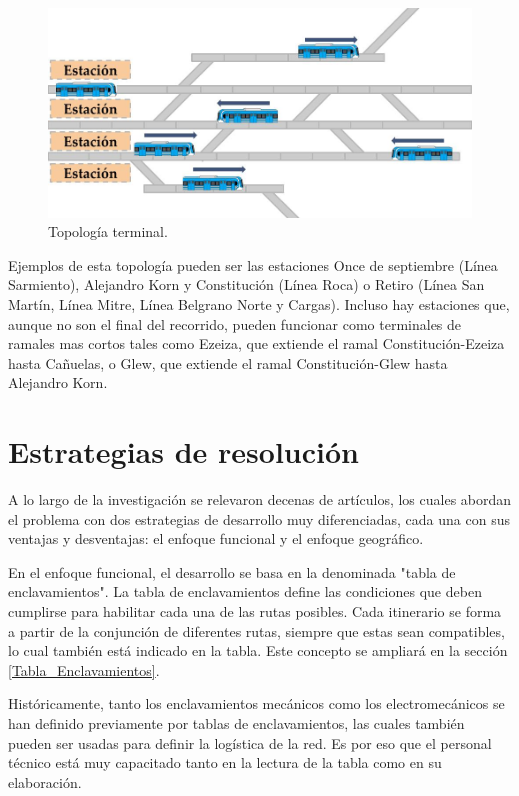 			\begin{figure}[h]
			\centering
				\includegraphics[scale=.4]{./Figures/Terminal}
				\caption{Topología terminal.}
				\label{fig:Terminal}
			\end{figure}
		
		Ejemplos de esta topología pueden ser las estaciones Once de septiembre (Línea Sarmiento), Alejandro Korn y Constitución (Línea Roca) o Retiro (Línea San Martín, Línea Mitre, Línea Belgrano Norte y Cargas). Incluso hay estaciones que, aunque no son el final del recorrido, pueden funcionar como terminales de ramales mas cortos tales como Ezeiza, que extiende el ramal Constitución-Ezeiza hasta Cañuelas, o Glew, que extiende el ramal Constitución-Glew hasta Alejandro Korn.
		

\section{Estrategias de resolución}
	\label{2_2}
	A lo largo de la investigación se relevaron decenas de artículos, los cuales abordan el problema con dos estrategias de desarrollo muy diferenciadas, cada una con sus ventajas y desventajas: el enfoque funcional y el enfoque geográfico.
	
	En el enfoque funcional, el desarrollo se basa en la denominada "tabla de enclavamientos". La tabla de enclavamientos define las condiciones que deben cumplirse para habilitar cada una de las rutas posibles. Cada itinerario se forma a partir de la conjunción de diferentes rutas, siempre que estas sean compatibles, lo cual también está indicado en la tabla. Este concepto se ampliará en la sección \ref{Tabla_Enclavamientos}.
	
	Históricamente, tanto los enclavamientos mecánicos como los electromecánicos se han definido previamente por tablas de enclavamientos, las cuales también pueden ser usadas para definir la logística de la red. Es por eso que el personal técnico está muy capacitado tanto en la lectura de la tabla como en su elaboración. 
	
